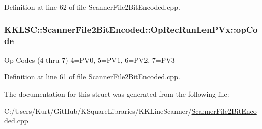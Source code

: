 Definition at line 62 of file Scanner\+File2\+Bit\+Encoded.\+cpp.

\subsubsection[{\texorpdfstring{op\+Code}{opCode}}]{ K\+K\+L\+S\+C\+::\+Scanner\+File2\+Bit\+Encoded\+::\+Op\+Rec\+Run\+Len\+P\+Vx\+::op\+Code}\hypertarget{struct_scanner_file2_bit_encoded_1_1_op_rec_run_len_p_vx_a3001c9a5c5ad13604cc200d34eb11625}{}\label{struct_scanner_file2_bit_encoded_1_1_op_rec_run_len_p_vx_a3001c9a5c5ad13604cc200d34eb11625}
Op Codes (4 thru 7) 4=P\+V0, 5=P\+V1, 6=P\+V2, 7=P\+V3 

Definition at line 61 of file Scanner\+File2\+Bit\+Encoded.\+cpp.



The documentation for this struct was generated from the following file\+:\begin{DoxyCompactItemize}
\item 
C\+:/\+Users/\+Kurt/\+Git\+Hub/\+K\+Square\+Libraries/\+K\+K\+Line\+Scanner/\hyperlink{_scanner_file2_bit_encoded_8cpp}{Scanner\+File2\+Bit\+Encoded.\+cpp}\end{DoxyCompactItemize}
